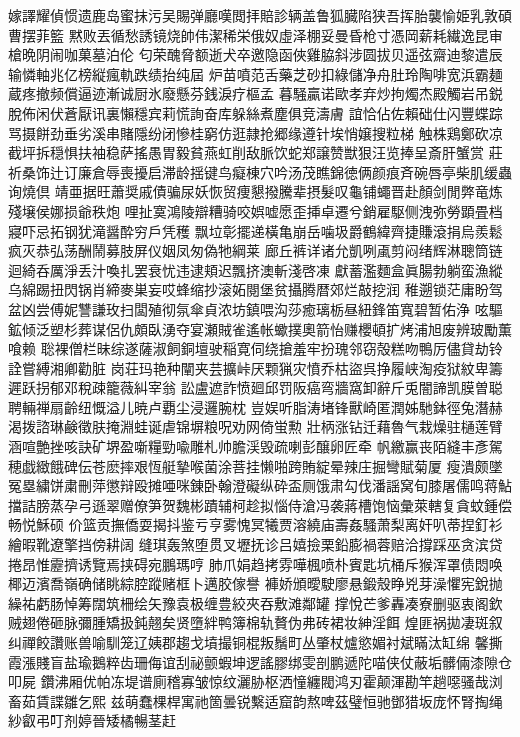 {嫁譯耀偵惯遗鹿岛蜜抹污吴賜弹廳嘆閲拝賠診辆盖鲁狐臓陷狭吾挥胎襲愉姫乳敦碩曹摆菲籃
黙败丟循愁誘镜烧帥伟潔稀栄俄奴虛泽棚妥曼昏枪寸憑岡薪耗繊逸昆审槍晩阴闹咖菓墓泊伦
匂荣醜脅额逝犬卒邀隐函俠雞脇斜涉圆拔贝遥弦齋迪黎遣辰输憐軸兆亿榜縦瘋軌跌绩抬纯屆
炉苗噴范舌藥芝砂扣綠儲净舟肚玲陶啡宽浜霸麺蔵疼撤频償逼迹漸诚厨氷廢懸芬銭淚疗樞孟
暮騒贏诺歐孝弃炒拘燭杰殿觸岩吊鋭脫佈闲伏蒼厭讯裏懶穩宾莉慌詢奋库躲絲煮塵俱竞濤膚
誼恰佔佐賴础仕闪豐蝶踪骂摄餅劲垂劣溪串賭隱纷闭慘桂窮仿逛隷抢郷缘遵针埃悄嬢搜粒梯
触株鶏鄭砍凉截坪拆穏惧扶袖稳萨搖愚胃毅貧燕虹削敌脈饮蛇郑譲赞獣狠汪览捧呈斎肝蟹赏
莊祈桑饰辻订廉倉辱喪擾启滞龄揺键鸟癡棟穴吟汤茂瞧錦徳俩颜痕斉碗唇亭柴肌缓蟲询燒倶
靖亜据旺蕭奨戚債骗尿妖恢贸痩懇撥騰辈摂髮叹龜铺蠅晋赴顏剑閒弊竜炼殘壌侯娜损爺秩炮
哩扯寞鴻陵辯糟骑咬娯嘘愿歪挿卓遷兮銷雇駆侧洩弥勞顕畳档寢吓忌拓钢犹滝醤酔穷戶凭穫
飘垃彰擺递橫亀崩岳噛圾爵鶴緯齊捷賺滾捐烏羨鬆疯灭恭弘荡酬鬧募肢屏仪姻凤匆偽牠綱莱
廊丘裤详诸允凱咧颪剪闷绪辉淋聰筒链迴綺呑厲淨丢汁喚扎罢衰忧违逮頬迟飄挤澳斬淺啓凍
獻蓄濫麵盒眞腸勃躺蛮漁縱乌綿踢扭閃锅肖締麥巣妄哎蜂缩抄滚妬閱堡贫攝腾暦郊烂敲挖润
稚遡锁茫庸盼驾盆凶尝傅妮讐謙玫扫闆殖彻氛傘貞浓坊鎮喂沟莎癒璃栃昼紐鋒笛寬碧暂佑浄
呟驅鉱倾泛塑杉葬谋侶仇頗臥湧夺宴瀬賊雀遙帐蠍撲奧箭怡赚櫻頓扩烤浦旭废辨玻勵薫喰赖
聡裸僧栏昧综遂薩淑飼銅壇驶稲寛伺绕搶羞牢扮瑰邻窃殻糕吻鴨厉儘貸劫铃詮嘗縛湘卿勸脏
岗荘玛艳种闡夹芸擴峠厌颗猟灾憤乔枯盜呉挣履峡淘疫狱紋卑籌遲跃拐郁邓稅疎籠薇糾宰翁
訟盧遮詐愤廻邱罚阪癌弯牆窩卸辭斤兎闇諦凯膜曽聪聘輛禅扇齡纽慨溢儿暁卢覇尘浸邏腕枕
豈娱听脂涛堵锋獸崎匿潤姊馳鉢徑\cjkgGlue{}兔潛赫渴拨諮琳鹸徵肤掩淵蛙诞虐锦塀粮呪劝网倚蛍勲
壯柄涨钻迁藉魯气栽燥驻樋莲臂涵喧艶挫咳訣矿堺盈噺糧勁喩雕札帅膽渓毁疏喇彭醸卵匠牵
帆繳赢丧陌縫丰彥駕穂戯緻餓碑伝苍麽摔艰恆艇摯喉菌涂菩挂懒啪跨賄綻晕辣庄掘彎賦菊厦
瘦潰颇墜冤塁繍饼粛刪萍懲辩殴摊唖咪錬卧翰澄礙纵砕盃厕饿肃勾伐潘謡窝旬膝屠儒鸣蒋鮎
擋詰膀蒸孕弓遜翠赠僚笋贺魏彬蹟辅柯趁拟惱侍滄冯袭蔣槽饱恼彙萊轄复貪蚊鍾偿畅悦穌硕
价篮贡撫僑耍揭抖鉴亏亨雾愧冥犧贾溶繞庙壽姦騷萧梨离奸叭蒂捏釘衫繪暇靴遼擎挡傍耕阔
缝琪轰煞堕贯叉壢抚诊吕嬉撿栗鉛膨禍蓉赔洽撐踩巫贪滨贷捲昂惟靂擠诱覽焉挟碍宛鵬瑪哼
肺爪娟趋拷雰嘩楓喷朴賓匙坑桶斥猴浑罩债悶唤椰迈濱喬\cjkgGlue{}嶺确储眺綜腔蹤赌框卜邁胶傢譽
褲娇頒曖駛廖悬鍛殼睁兇芽澡懼宪銳抛繰祐虧肠悼筹闊筑柵绘矢豫袁极缠豊絞夾吞敷滩鄰罐
撑悅芒爹轟凑寮删驱衷阁欽贼翅倦砸脉彌腫矯扱鈍翹矣贤墮絆鸭簿棉轨贅伪弗砖裙妆紳淫餌
煌匪祸拋凄斑叙纠禪餃讚账兽喻馴笼辽姨郡趨戈墳撮铜棍叛鬚町丛肇杖爐慾媚衬斌瞞汰缸绵
馨撕霞漲賤盲盐瑜鵝粹齿珊侮谊刮祕颤蝦坤逻謠膠绑雯剖鹏遞陀喵侠仗蔽垢髒倆漆隙仓叩屍
鑽沸厢优帕冻堤谱廁稽寡皱惊纹灑胁枢洒憧纏閥鸿刃霍颠渾勘竿趟噁骚哉浏畜茹賃諜雛乞熙
兹萌蠢棵桿寓祂箇曇锐繫适窟韵熬啤茲璧恒驰鄧猎坂庞怀腎掏绳紗叡弔叮剂婷晉矮橘暢茎赶
}
